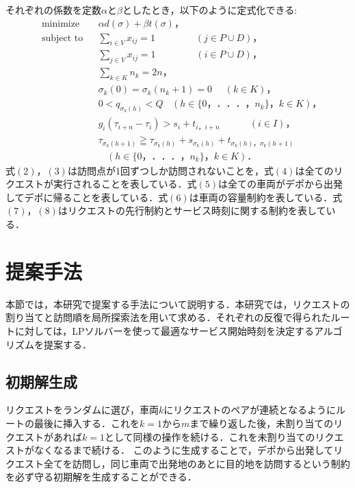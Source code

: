 \documentclass[a4j，11pt，twocolumn]{jsarticle}
\begin{document}
それぞれの係数を定数$\alpha$と$\beta$としたとき，以下のように定式化できる:
\begin{align*}
  &\textrm{minimize}   &&
  \alpha d(\sigma)+ \beta t(\sigma)，\tag{1}\\
  &\textrm{subject to} && \sum_{i \in V} x_{ij} = 1 \ \ \ \ \ \ \ \ \ \ \ \ \ \ \ \ \ \ \ (j \in  P \cup D)，\tag{2}\\
  &                    && \sum_{j \in V} x_{ij} = 1 \ \ \ \ \ \ \ \ \ \ \ \ \ \ \ \ \ \ \ (i \in  P \cup D)，\tag{3}\\
  &                    && \sum_{k \in K} n_k = 2n，\tag{4}\\
  &                    && \sigma_k(0) = \sigma_k(n_k+1) = 0 \ \ \ \ \ \ (k \in K)，\tag{5}\\
  &                    && 0 < q_{\sigma_k(h)} < Q\ \ \ \
  (h \in \{0，．．．，n_k\}，k \in K)，\tag{6}\\
  &                    && g_i(\tau_{i+n}-\tau_i) > s_i + t_{i，i+n}\ \ \ \ \ \ \ \ \ \ \ \ \ \  (i \in I)，\tag{7}\\
  &                    && \tau_ {\sigma_k (h+1)} \geqq \tau_ {\sigma_k (h)} + s_{\sigma_k (h)} + t_ {\sigma_k (h)，\sigma_k (h+1)}\\
  &                    &&  \ \ \ \ (h \in \{0，．．．，n_k\}，k \in K)．\tag{8}
\end{align*}
式$(2)，(3)$は訪問点が1回ずつしか訪問されないことを，式$(4)$は全てのリクエストが実行されることを表している．式$(5)$は全ての車両がデポから出発してデポに帰ることを表している．式$(6)$は車両の容量制約を表している．式$(7)，(8)$はリクエストの先行制約とサービス時刻に関する制約を表している．

\section{提案手法}
本節では，本研究で提案する手法について説明する．本研究では，リクエストの割り当てと訪問順を局所探索法を用いて求める．それぞれの反復で得られたルートに対しては，LPソルバーを使って最適なサービス開始時刻を決定するアルゴリズムを提案する．

\subsection{{\large 初期解生成}}
リクエストをランダムに選び，車両$k$にリクエストのペアが連続となるようにルートの最後に挿入する．これを$k = 1 から m$まで繰り返した後，未割り当てのリクエストがあれば$k = 1 $として同様の操作を続ける．これを未割り当てのリクエストがなくなるまで続ける．
このように生成することで，デポから出発してリクエスト全てを訪問し，同じ車両で出発地のあとに目的地を訪問するという制約を必ず守る初期解を生成することができる．
\end{document}
